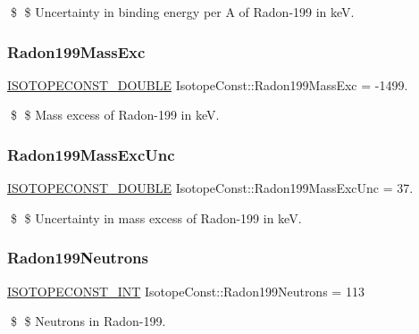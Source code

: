 \$ \$ Uncertainty in binding energy per A of Radon-\/199 in keV. \mbox{\label{group___isotope_const-_radon-_rn199_ga76c75456339d813adc8aabc0716f789c}} 
\subsubsection{\texorpdfstring{Radon199\+Mass\+Exc}{Radon199MassExc}}
{\footnotesize\ttfamily \mbox{\hyperlink{group___isotope_const-_macros_ga8f45a7272ce02c0b4c65c44636ed719a}{I\+S\+O\+T\+O\+P\+E\+C\+O\+N\+S\+T\+\_\+\+D\+O\+U\+B\+LE}} Isotope\+Const\+::\+Radon199\+Mass\+Exc = -\/1499.}

\$ \$ Mass excess of Radon-\/199 in keV. \mbox{\label{group___isotope_const-_radon-_rn199_ga9b550c8347179c49e9dd39a6c59b2796}} 
\subsubsection{\texorpdfstring{Radon199\+Mass\+Exc\+Unc}{Radon199MassExcUnc}}
{\footnotesize\ttfamily \mbox{\hyperlink{group___isotope_const-_macros_ga8f45a7272ce02c0b4c65c44636ed719a}{I\+S\+O\+T\+O\+P\+E\+C\+O\+N\+S\+T\+\_\+\+D\+O\+U\+B\+LE}} Isotope\+Const\+::\+Radon199\+Mass\+Exc\+Unc = 37.}

\$ \$ Uncertainty in mass excess of Radon-\/199 in keV. \mbox{\label{group___isotope_const-_radon-_rn199_ga6de64940364ddfc6cc9cee339522d0c3}} 
\subsubsection{\texorpdfstring{Radon199\+Neutrons}{Radon199Neutrons}}
{\footnotesize\ttfamily \mbox{\hyperlink{group___isotope_const-_macros_ga5f18360b3e99483a35c32d789e62621c}{I\+S\+O\+T\+O\+P\+E\+C\+O\+N\+S\+T\+\_\+\+I\+NT}} Isotope\+Const\+::\+Radon199\+Neutrons = 113}

\$ \$ Neutrons in Radon-\/199. \mbox{\label{group___isotope_const-_radon-_rn199_ga97777f365e671c927fe67671e82302c0}} 

